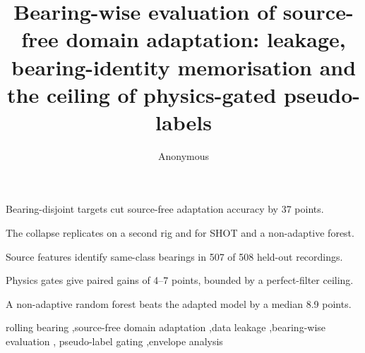 \documentclass[preprint,3p,times]{elsarticle}
\begin{document}
\begin{frontmatter}

\title{Bearing-wise evaluation of source-free domain adaptation: leakage, bearing-identity memorisation and the ceiling of
physics-gated pseudo-labels}

\author[a]{Anonymous}
\address[a]{Affiliation withheld}

\begin{abstract}

\end{abstract}

\begin{highlights}
\item Bearing-disjoint targets cut source-free adaptation accuracy by 37 points.
\item The collapse replicates on a second rig and for SHOT and a non-adaptive forest.
\item Source features identify same-class bearings in 507 of 508 held-out recordings.
\item Physics gates give paired gains of 4--7 points, bounded by a perfect-filter ceiling.
\item A non-adaptive random forest beats the adapted model by a median 8.9 points.
\end{highlights}

\begin{keyword}
rolling bearing \sep source-free domain adaptation \sep data leakage \sep bearing-wise evaluation \sep
pseudo-label gating \sep envelope analysis
\end{keyword}

\end{frontmatter}















\end{document}

